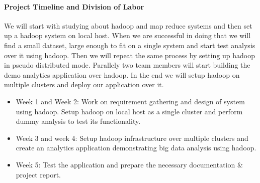 \paragraph{Project Timeline and Division of Labor}
We will start with studying about hadoop and map reduce systems and then  set up a hadoop system on local host. When we are successful in doing that we will find a small dataset, large enough to fit on a single system and start test analysis over it using hadoop. Then we will repeat the same process by setting up hadoop in pseudo distributed mode. Parallely two team members will start building the demo analytics application over hadoop. In the end we will setup hadoop on multiple clusters and deploy our application over it.
\begin{itemize}
	\item Week 1 and Week 2: Work on requirement gathering and design of system using hadoop. Setup hadoop on local host as a single cluster and perform dummy analysis to test its functionality.
	\item Week 3 and week 4: Setup hadoop infrastructure over multiple clusters and create an analytics application demonstrating big data analysis using hadoop.
	\item Week 5: Test the application and prepare the necessary documentation & project report.
\end{itemize}